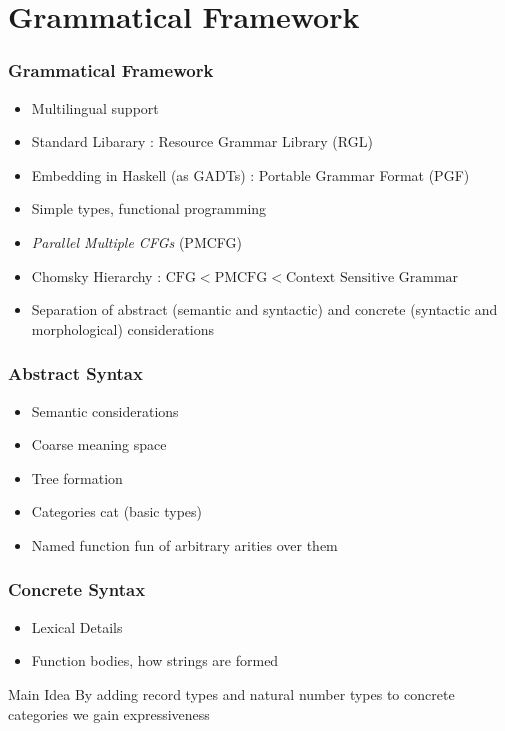 \documentclass{beamer}
\begin{document}
\section{Grammatical Framework}

\begin{frame}
\frametitle{Grammatical Framework}
\begin{itemize}[<+->]
\item Multilingual support
\item Standard Libarary : Resource Grammar Library (RGL)
\item Embedding in Haskell (as GADTs) : Portable Grammar Format (PGF)
\item Simple types, functional programming
\item \emph{Parallel Multiple CFGs} (PMCFG)
\item Chomsky Hierarchy : $\text{CFG} < \text{PMCFG} < \text{Context Sensitive Grammar}$
\item Separation of abstract (semantic and syntactic) and concrete (syntactic and
 morphological) considerations
\end{itemize}
\end{frame}

\begin{frame}
\frametitle{Abstract Syntax}
\begin{itemize}[<+->]
\item Semantic considerations
\item Coarse meaning space
\item Tree formation
\item Categories cat (basic types)
\item Named function fun of arbitrary arities over them
\end{itemize}
\end{frame}

\begin{frame}
\frametitle{Concrete Syntax}
\begin{itemize}[<+->]
\item Lexical Details
\item Function bodies, how strings are formed
\end{itemize}
\pause
\begin{alertblock}{Main Idea}
By adding record types and natural number types to concrete categories we gain expressiveness
\end{alertblock}
\end{frame}
\end{document}
